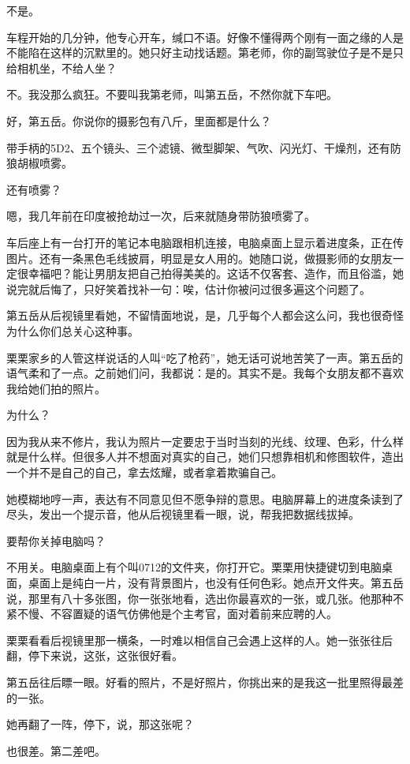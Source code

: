 \documentclass[lang=cn,newtx,12pt,scheme=chinese]{elegantbook}
\begin{document}
不是。

车程开始的几分钟，他专心开车，缄口不语。好像不懂得两个刚有一面之缘的人是不能陷在这样的沉默里的。她只好主动找话题。第老师，你的副驾驶位子是不是只给相机坐，不给人坐？

不。我没那么疯狂。不要叫我第老师，叫第五岳，不然你就下车吧。

好，第五岳。你说你的摄影包有八斤，里面都是什么？

带手柄的5D2、五个镜头、三个滤镜、微型脚架、气吹、闪光灯、干燥剂，还有防狼胡椒喷雾。

还有喷雾？

嗯，我几年前在印度被抢劫过一次，后来就随身带防狼喷雾了。

车后座上有一台打开的笔记本电脑跟相机连接，电脑桌面上显示着进度条，正在传图片。还有一条黑色毛线披肩，明显是女人用的。她随口说，做摄影师的女朋友一定很幸福吧？能让男朋友把自己拍得美美的。这话不仅客套、造作，而且俗滥，她说完就后悔了，只好笑着找补一句：唉，估计你被问过很多遍这个问题了。

第五岳从后视镜里看她，不留情面地说，是，几乎每个人都会这么问，我也很奇怪为什么你们总关心这种事。

栗栗家乡的人管这样说话的人叫“吃了枪药”，她无话可说地苦笑了一声。第五岳的语气柔和了一点。之前她们问，我都说：是的。其实不是。我每个女朋友都不喜欢我给她们拍的照片。

为什么？

因为我从来不修片，我认为照片一定要忠于当时当刻的光线、纹理、色彩，什么样就是什么样。但很多人并不想面对真实的自己，她们只想靠相机和修图软件，造出一个并不是自己的自己，拿去炫耀，或者拿着欺骗自己。

她模糊地哼一声，表达有不同意见但不愿争辩的意思。电脑屏幕上的进度条读到了尽头，发出一个提示音，他从后视镜里看一眼，说，帮我把数据线拔掉。

要帮你关掉电脑吗？

不用关。电脑桌面上有个叫0712的文件夹，你打开它。栗栗用快捷键切到电脑桌面，桌面上是纯白一片，没有背景图片，也没有任何色彩。她点开文件夹。第五岳说，那里有八十多张图，你一张张地看，选出你最喜欢的一张，或几张。他那种不紧不慢、不容置疑的语气仿佛他是个主考官，面对着前来应聘的人。

栗栗看看后视镜里那一横条，一时难以相信自己会遇上这样的人。她一张张往后翻，停下来说，这张，这张很好看。

第五岳往后瞟一眼。好看的照片，不是好照片，你挑出来的是我这一批里照得最差的一张。

她再翻了一阵，停下，说，那这张呢？

也很差。第二差吧。
\end{document}
